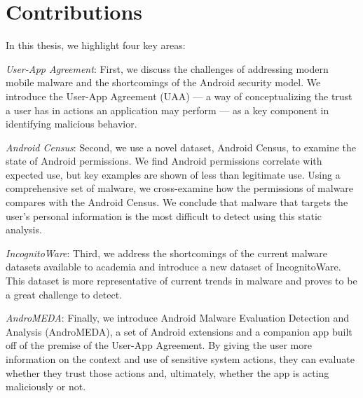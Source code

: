 \section{Contributions}
In this thesis, we highlight four key areas:
\begin{smitemize}
\item \textit{User-App Agreement}: First, we discuss the challenges of addressing modern mobile malware and the shortcomings of the Android security model. We introduce the User-App Agreement (UAA) --- a way of conceptualizing the trust a user has in actions an application may perform --- as a key component in identifying malicious behavior.
\item \textit{Android Census}: Second, we use a novel dataset, Android Census, to examine the state of Android permissions. We find Android permissions correlate with expected use, but key examples are shown of less than legitimate use. Using a comprehensive set of malware, we cross-examine how the permissions of malware compares with the Android Census. We conclude that malware that targets the user's personal information is the most difficult to detect using this static analysis.
\item \textit{IncognitoWare}: Third, we address the shortcomings of the current malware datasets available to academia and introduce a new dataset of IncognitoWare. This dataset is more representative of current trends in malware and proves to be a great challenge to detect.
\item \textit{AndroMEDA}: Finally, we introduce Android Malware Evaluation Detection and Analysis (AndroMEDA), a set of Android extensions and a companion app built off of the premise of the User-App Agreement. By giving the user more information on the context and use of sensitive system actions, they can evaluate whether they trust those actions and, ultimately, whether the app is acting maliciously or not.
\end{smitemize}








